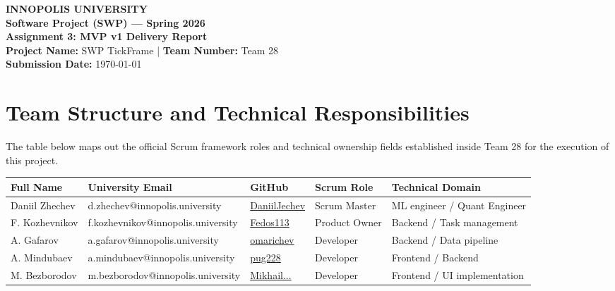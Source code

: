 \documentclass[11pt,a4paper]{article}
\begin{document}
\begin{center}
    {\large \textbf{INNOPOLIS UNIVERSITY}} \\
    \vspace{0.1cm}
    {\large \textbf{Software Project (SWP) — Spring 2026}} \\
    \vspace{0.5cm}
    \textbf{\Large Assignment 3: MVP v1 Delivery Report} \\
    \vspace{0.3cm}
    \textbf{Project Name:} SWP TickFrame \quad | \quad \textbf{Team Number:} Team 28 \\
    \textbf{Submission Date:} \today
\end{center}

\vspace{0.5cm}

\section{Team Structure and Technical Responsibilities}
The table below maps out the official Scrum framework roles and technical ownership fields established inside Team 28 for the execution of this project.

\vspace{0.2cm}
\begin{table}[h!]
    \centering
    \small
    \begin{tabular}{lllll}
        \toprule
        \textbf{Full Name} & \textbf{University Email} & \textbf{GitHub} & \textbf{Scrum Role} & \textbf{Technical Domain} \\
        \midrule
        Daniil Zhechev & d.zhechev@innopolis.university & \href{https://github.com/DaniilJechev}{DaniilJechev} & Scrum Master & ML engineer / Quant Engineer \\
        F. Kozhevnikov & f.kozhevnikov@innopolis.university & \href{https://github.com/Fedos113}{Fedos113} & Product Owner & Backend / Task management \\
        A. Gafarov & a.gafarov@innopolis.university & \href{https://github.com/omarichev}{omarichev} & Developer & Backend / Data pipeline \\
        A. Mindubaev & a.mindubaev@innopolis.university & \href{https://github.com/pug228}{pug228} & Developer & Frontend / Backend \\
        M. Bezborodov & m.bezborodov@innopolis.university & \href{https://github.com/MikhailBezborodov024}{Mikhail...} & Developer & Frontend / UI implementation \\
        \bottomrule
    \end{tabular}
\end{table}
\end{document}
